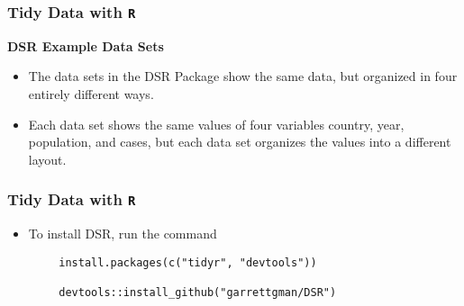 \documentclass[TIDYMASTER.tex]{subfiles}
\begin{document}
\begin{frame}
	\frametitle{Tidy Data with \texttt{R}}
	\Large
	\noindent \textbf{DSR Example Data Sets}
	\begin{itemize}
		\item The data sets in the DSR Package show the same data, but  organized in four entirely different ways. 
		\item Each data set shows the same values of four variables country, year, population, and cases, but each data set organizes the values into a different layout. 
	\end{itemize}
	
\end{frame}
\begin{frame}[fragile]
	\frametitle{Tidy Data with \texttt{R}}
	\Large
	\begin{itemize}
		\item To install DSR, run the command
	\end{itemize}
	{
		\large
	\begin{framed}
		\begin{verbatim}
		install.packages(c("tidyr", "devtools"))
		
		devtools::install_github("garrettgman/DSR")
		\end{verbatim}
	\end{framed}
}
	
	
\end{frame}
\end{document}

